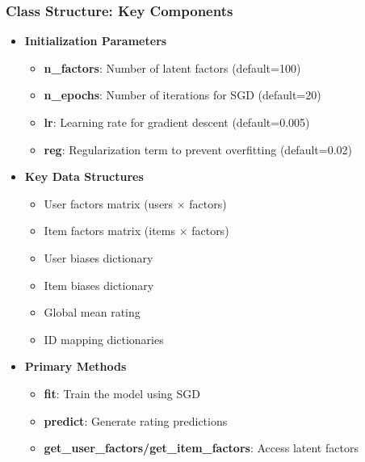 \documentclass{beamer}
\begin{document}
\begin{frame}
\frametitle{Class Structure: Key Components}

\begin{itemize}
    \item \textbf{Initialization Parameters}
    \begin{itemize}
        \item \textbf{n\_factors}: Number of latent factors (default=100)
        \item \textbf{n\_epochs}: Number of iterations for SGD (default=20)
        \item \textbf{lr}: Learning rate for gradient descent (default=0.005)
        \item \textbf{reg}: Regularization term to prevent overfitting (default=0.02)
    \end{itemize}
    
    \item \textbf{Key Data Structures}
    \begin{itemize}
        \item User factors matrix (users × factors)
        \item Item factors matrix (items × factors)
        \item User biases dictionary
        \item Item biases dictionary
        \item Global mean rating
        \item ID mapping dictionaries
    \end{itemize}
    
    \item \textbf{Primary Methods}
    \begin{itemize}
        \item \textbf{fit}: Train the model using SGD
        \item \textbf{predict}: Generate rating predictions
        \item \textbf{get\_user\_factors/get\_item\_factors}: Access latent factors
    \end{itemize}
\end{itemize}
\end{frame}
\end{document}
